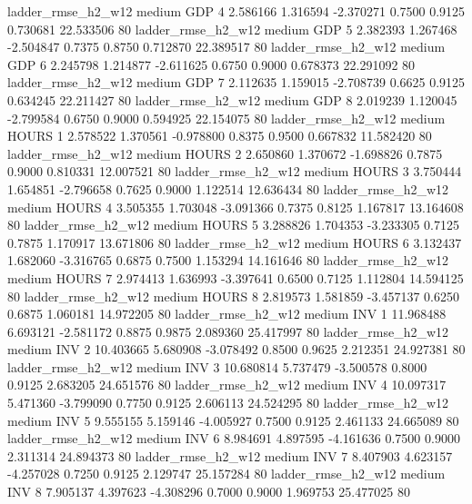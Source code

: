     ladder_rmse_h2_w12     medium      GDP                 4  2.586166 1.316594 -2.370271 0.7500 0.9125  0.730681   22.533506 80
    ladder_rmse_h2_w12     medium      GDP                 5  2.382393 1.267468 -2.504847 0.7375 0.8750  0.712870   22.389517 80
    ladder_rmse_h2_w12     medium      GDP                 6  2.245798 1.214877 -2.611625 0.6750 0.9000  0.678373   22.291092 80
    ladder_rmse_h2_w12     medium      GDP                 7  2.112635 1.159015 -2.708739 0.6625 0.9125  0.634245   22.211427 80
    ladder_rmse_h2_w12     medium      GDP                 8  2.019239 1.120045 -2.799584 0.6750 0.9000  0.594925   22.154075 80
    ladder_rmse_h2_w12     medium    HOURS                 1  2.578522 1.370561 -0.978800 0.8375 0.9500  0.667832   11.582420 80
    ladder_rmse_h2_w12     medium    HOURS                 2  2.650860 1.370672 -1.698826 0.7875 0.9000  0.810331   12.007521 80
    ladder_rmse_h2_w12     medium    HOURS                 3  3.750444 1.654851 -2.796658 0.7625 0.9000  1.122514   12.636434 80
    ladder_rmse_h2_w12     medium    HOURS                 4  3.505355 1.703048 -3.091366 0.7375 0.8125  1.167817   13.164608 80
    ladder_rmse_h2_w12     medium    HOURS                 5  3.288826 1.704353 -3.233305 0.7125 0.7875  1.170917   13.671806 80
    ladder_rmse_h2_w12     medium    HOURS                 6  3.132437 1.682060 -3.316765 0.6875 0.7500  1.153294   14.161646 80
    ladder_rmse_h2_w12     medium    HOURS                 7  2.974413 1.636993 -3.397641 0.6500 0.7125  1.112804   14.594125 80
    ladder_rmse_h2_w12     medium    HOURS                 8  2.819573 1.581859 -3.457137 0.6250 0.6875  1.060181   14.972205 80
    ladder_rmse_h2_w12     medium      INV                 1 11.968488 6.693121 -2.581172 0.8875 0.9875  2.089360   25.417997 80
    ladder_rmse_h2_w12     medium      INV                 2 10.403665 5.680908 -3.078492 0.8500 0.9625  2.212351   24.927381 80
    ladder_rmse_h2_w12     medium      INV                 3 10.680814 5.737479 -3.500578 0.8000 0.9125  2.683205   24.651576 80
    ladder_rmse_h2_w12     medium      INV                 4 10.097317 5.471360 -3.799090 0.7750 0.9125  2.606113   24.524295 80
    ladder_rmse_h2_w12     medium      INV                 5  9.555155 5.159146 -4.005927 0.7500 0.9125  2.461133   24.665089 80
    ladder_rmse_h2_w12     medium      INV                 6  8.984691 4.897595 -4.161636 0.7500 0.9000  2.311314   24.894373 80
    ladder_rmse_h2_w12     medium      INV                 7  8.407903 4.623157 -4.257028 0.7250 0.9125  2.129747   25.157284 80
    ladder_rmse_h2_w12     medium      INV                 8  7.905137 4.397623 -4.308296 0.7000 0.9000  1.969753   25.477025 80

